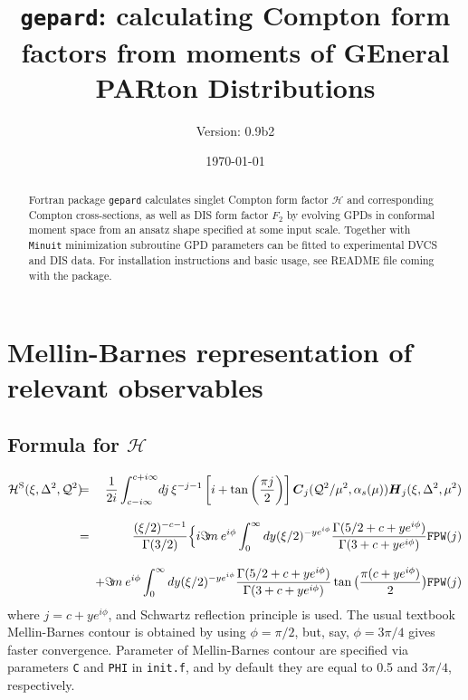 \documentclass[12pt]{article}
\begin{document}
\title{\texttt{gepard}: calculating Compton form factors from moments of GEneral PARton Distributions } 
\author{Version: 0.9b2}
\date{\today}
\maketitle

\begin{abstract}
Fortran package \texttt{gepard} calculates singlet Compton form factor
$\mathcal{H}$ and corresponding Compton cross-sections, as well as
DIS form factor $F_2$ by evolving GPDs in conformal moment space from an ansatz shape
specified at some input scale.  Together
with \texttt{Minuit} minimization subroutine GPD parameters can be fitted to
experimental DVCS and DIS data. For installation instructions and
basic usage, see README file coming with the package.
\end{abstract}

\tableofcontents

\section{Mellin-Barnes representation of relevant observables}

\subsection{Formula for $\mathcal{H}$}  

\begin{eqnarray*}
{{\cal H}^{\rm S}}(\xi,\Delta^2,{\cal Q}^2)
&\!\!\!=\!\!\!& \frac{1}{2i}\int_{c-i \infty}^{c+ i \infty}\!
dj\,\xi^{-j-1} \left[i + \tan \left(\frac{\pi j}{2}\right) \right]
\mbox{\boldmath $C$}_{j}({\cal Q}^2/\mu^2,\alpha_s(\mu)) 
\mbox{\boldmath $H$}_{j} (\xi,\Delta^2,\mu^2) \\[2ex]
&\!\!\!=\!\!\!& \frac{(\xi/2)^{-c-1}}{\Gamma(3/2)}\Big\{i \Im\! m\: e^{i\phi} 
\int_{0}^{\infty} dy  (\xi/2)^{- y e^{i\phi}} 
\frac{\Gamma(5/2 + c + y e^{i\phi})}{\Gamma(3 + c + y e^{i\phi})}
\texttt{FPW}(j) \\[2ex]
& & + \Im\! m\:  e^{i\phi} 
\int_{0}^{\infty} dy  (\xi/2)^{- y e^{i\phi}}
\frac{\Gamma(5/2 + c + y e^{i\phi})}{\Gamma(3 + c + y e^{i\phi})}
\tan\big(\frac{\pi(c + y e^{i\phi})}{2}\big)
\texttt{FPW}(j)
\label{<Hformula>}
\end{eqnarray*} 
where $j=c+ye^{i\phi}$, and Schwartz reflection principle is
used.
The usual textbook Mellin-Barnes contour is obtained by
using $\phi = \pi/2$, but, say, $\phi = 3\pi /4$ gives faster
convergence. Parameter of Mellin-Barnes contour are specified
via parameters \texttt{C} and \texttt{PHI} in \texttt{init.f},
and by default they are equal to 0.5 and $3\pi/4$, respectively.
\end{document}
